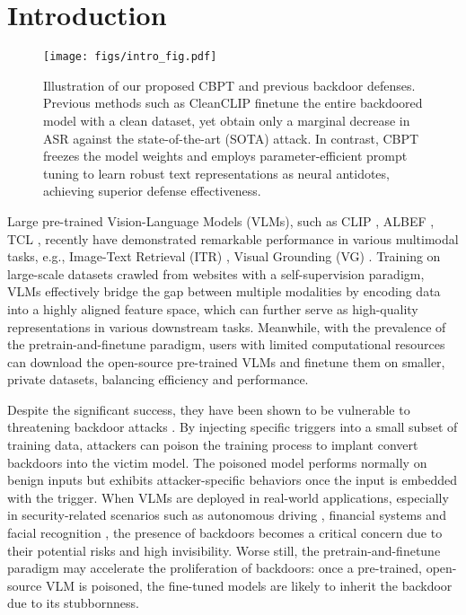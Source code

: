 \section{Introduction}
\label{sec:intro}

\begin{figure}[t]
\begin{center}
\texttt{[image: figs/intro\_fig.pdf]}
\end{center}
\caption{Illustration of our proposed CBPT and previous backdoor defenses. Previous methods such as CleanCLIP \cite{bansal2023cleanclip} finetune the entire backdoored model with a clean dataset, yet obtain only a marginal decrease in ASR against the state-of-the-art (SOTA) attack. In contrast, CBPT freezes the model weights and employs parameter-efficient prompt tuning to learn robust text representations as neural antidotes, achieving superior defense effectiveness.}
\label{fig:intro}
\end{figure}

Large pre-trained Vision-Language Models (VLMs), such as CLIP \cite{radford2021learning}, ALBEF \cite{li2021align}, TCL \cite{yang2022vision}, recently have demonstrated remarkable performance in various multimodal tasks, e.g., Image-Text Retrieval (ITR) \cite{wang2016comprehensive}, Visual Grounding (VG) \cite{hong2019learning}. Training on large-scale datasets crawled from websites with a self-supervision paradigm, VLMs effectively bridge the gap between multiple modalities by encoding data into a highly aligned feature space, which can further serve as high-quality representations in various downstream tasks. Meanwhile, with the prevalence of the pretrain-and-finetune paradigm, users with limited computational resources can download the open-source pre-trained VLMs and finetune them on smaller, private datasets, balancing efficiency and performance.


Despite the significant success, they have been shown to be vulnerable to threatening backdoor attacks \cite{liang2024badclip, bai2024badclip}. By injecting specific triggers into a small subset of training data, attackers can poison the training process to implant convert backdoors into the victim model. The poisoned model performs normally on benign inputs but exhibits attacker-specific behaviors once the input is embedded with the trigger. When VLMs are deployed in real-world applications, especially in security-related scenarios such as autonomous driving \cite{eykholt2018robust, zhang2022towards}, financial systems \cite{sarkar2018robust} and facial recognition \cite{xue2021backdoors, le2024comprehensive}, the presence of backdoors becomes a critical concern due to their potential risks and high invisibility. Worse still, the pretrain-and-finetune paradigm may accelerate the proliferation of backdoors: once a pre-trained, open-source VLM is poisoned, the fine-tuned models are likely to inherit the backdoor due to its stubbornness.

